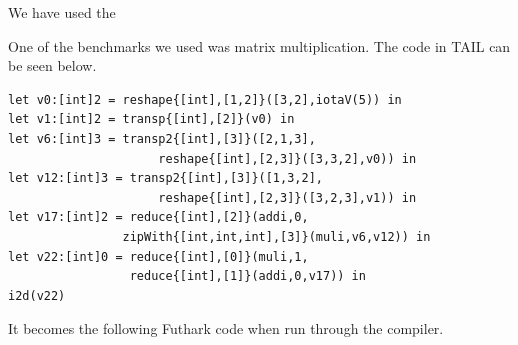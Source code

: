 \documentclass[11pt]{article}
\begin{document}
We have used the 


One of the benchmarks we used was matrix multiplication. The code in TAIL can be seen below. 

\begin{lstlisting}
let v0:[int]2 = reshape{[int],[1,2]}([3,2],iotaV(5)) in
let v1:[int]2 = transp{[int],[2]}(v0) in
let v6:[int]3 = transp2{[int],[3]}([2,1,3],
                     reshape{[int],[2,3]}([3,3,2],v0)) in
let v12:[int]3 = transp2{[int],[3]}([1,3,2],
                     reshape{[int],[2,3]}([3,2,3],v1)) in
let v17:[int]2 = reduce{[int],[2]}(addi,0,
                zipWith{[int,int,int],[3]}(muli,v6,v12)) in
let v22:[int]0 = reduce{[int],[0]}(muli,1,
                 reduce{[int],[1]}(addi,0,v17)) in
i2d(v22)
\end{lstlisting}

It becomes the following Futhark code when run through the compiler.

{} 

\end{document}
